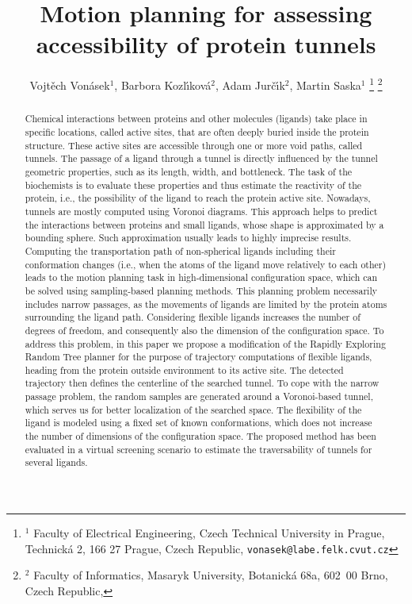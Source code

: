 \documentclass[usletter, 10pt, conference]{ieeeconf} %
\title{Motion planning for assessing accessibility of protein tunnels}
\author{Vojt\v ech Von\' asek$^{1}$,
    Barbora Kozl\'\i kov\'a$^{2}$,
    Adam Jur\v{c}\'\i k$^{2}$,
    Martin Saska$^{1}$
\thanks{$^{1}$ Faculty of Electrical Engineering,  Czech Technical University in Prague, 
Technick\'a 2, 166 27 Prague, Czech Republic,
{\tt vonasek@labe.felk.cvut.cz}}
\thanks{$^{2}$        
Faculty of Informatics,   Masaryk University, Botanick\'a 68a, 602~00 Brno, Czech Republic,
}
}
\begin{document}
\maketitle
\thispagestyle{empty}
\pagestyle{empty}

\begin{abstract}
Chemical interactions between proteins and other molecules (ligands) take place in specific locations, called active sites, that are often deeply buried inside the protein structure.
These active sites are accessible through one or more void paths, called tunnels.
The passage of a ligand through a tunnel is directly influenced by the tunnel geometric properties, such as its length, width, and bottleneck.
The task of the biochemists is to evaluate these properties and thus estimate the reactivity of the protein, i.e., the possibility of the ligand to reach the protein active site.
Nowadays, tunnels are mostly computed using Voronoi diagrams. 
This approach helps to predict the interactions between proteins and small ligands, whose shape is approximated by a bounding sphere.
Such approximation usually leads to highly imprecise results.
Computing the transportation path of non-spherical ligands including their conformation changes (i.e., when the atoms of the ligand move relatively to each other) leads to the motion planning task in high-dimensional configuration space, which can be solved using sampling-based planning methods.
This planning problem necessarily includes narrow passages, as the movements of ligands are limited by the protein atoms surrounding the ligand path.
Considering flexible ligands increases the number of degrees of freedom, and consequently also the dimension of the configuration space.
To address this problem, in this paper we propose a modification of the Rapidly Exploring Random Tree planner for the purpose of trajectory computations of flexible ligands, heading from the protein outside environment to its active site.
The detected trajectory then defines the centerline of the searched tunnel.
To cope with the narrow passage problem, the random samples are generated around a Voronoi-based tunnel, which serves us for better localization of the searched space.
The flexibility of the ligand is modeled using a fixed set of known conformations, which does not increase the number of dimensions of the configuration space.
The proposed method has been evaluated in a virtual screening scenario to estimate the traversability of tunnels for several ligands.
\end{abstract}
\end{document}
